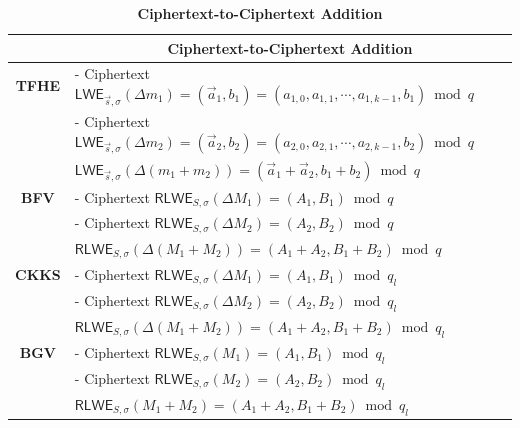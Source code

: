 \begin{table}[h]
\begin{tabular}{|c||l|}
\hline
&\multicolumn{1}{c|}{\textbf{Ciphertext-to-Ciphertext Addition}}\\\hline\hline
\textbf{TFHE}&- Ciphertext $\textsf{LWE}_{\vec{s}, \sigma}(\Delta m_1) = (\vec{a}_1, b_1) = (a_{1,0}, a_{1, 1}, \cdots, a_{1, k-1}, b_1) \bmod q$\\
&- Ciphertext $\textsf{LWE}_{\vec{s}, \sigma}(\Delta m_2) = (\vec{a}_2, b_2) = (a_{2,0}, a_{2, 1}, \cdots, a_{2, k-1}, b_2) \bmod q$\\
&$\textsf{LWE}_{\vec{s}, \sigma}(\Delta (m_1 + m_2)) = (\vec{a}_1+\vec{a}_2, b_1+b_2) \bmod q$\\\hline
\textbf{BFV}&- Ciphertext $\textsf{RLWE}_{S, \sigma}(\Delta M_1) = (A_1, B_1) \bmod q$\\
&- Ciphertext $\textsf{RLWE}_{S, \sigma}(\Delta M_2) = (A_2, B_2) \bmod q$\\
&$\textsf{RLWE}_{S, \sigma}(\Delta (M_1 + M_2)) =(A_1+A_2,B_1+B_2) \bmod q$\\\hline
\textbf{CKKS}&- Ciphertext $\textsf{RLWE}_{S, \sigma}(\Delta M_1) = (A_1, B_1) \bmod q_l$\\
&- Ciphertext $\textsf{RLWE}_{S, \sigma}(\Delta M_2) = (A_2, B_2) \bmod q_l$\\
&$\textsf{RLWE}_{S, \sigma}(\Delta (M_1 + M_2)) =(A_1+A_2,B_1+B_2) \bmod q_l$\\\hline
\textbf{BGV}&- Ciphertext $\textsf{RLWE}_{S, \sigma}(M_1) = (A_1, B_1) \bmod q_l$\\
&- Ciphertext $\textsf{RLWE}_{S, \sigma}(M_2) = (A_2, B_2) \bmod q_l$\\
&$\textsf{RLWE}_{S, \sigma}(M_1 + M_2) =(A_1+A_2,B_1+B_2) \bmod q_l$\\\hline
\end{tabular}
\caption{\textbf{Ciphertext-to-Ciphertext Addition}}
\end{table}

